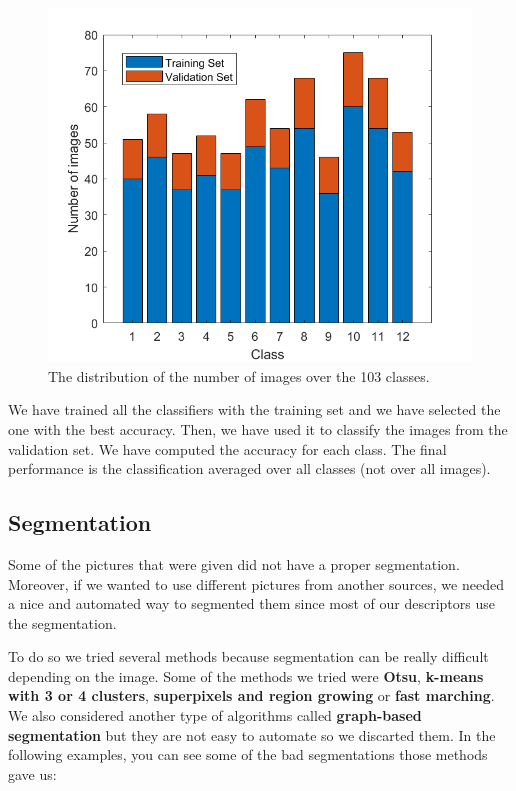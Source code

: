 \documentclass[11]{article}
\begin{document}
\begin{figure}[H]
	\centering
	\includegraphics[scale=0.45]{./images/barplot}
	
	\caption{The distribution of the number of images over the 103
classes.}
	\label{fig:barplot}
\end{figure}

We have trained all the classifiers with the training set and we have selected the one with the best accuracy. Then, we have used it to classify the images from the validation set. We have computed the accuracy for each class. The final performance is the classification averaged over all classes (not over all images).

\subsection{Segmentation}

Some of the pictures that were given did not have a proper segmentation. Moreover, if we wanted to use different pictures from another sources, we needed a nice and automated way to segmented them since most of our descriptors use the segmentation.\\
\medskip

To do so we tried several methods because segmentation can be really difficult depending on the image. Some of the methods we tried were \textbf{Otsu}, \textbf{k-means with 3 or 4 clusters}, \textbf{superpixels and region growing} or \textbf{fast marching}. We also considered another type of algorithms called \textbf{graph-based segmentation} but they are not easy to automate so we discarted them. In the following examples, you can see some of the bad segmentations those methods gave us:
\end{document}
